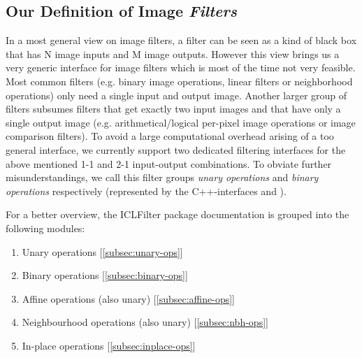 \subsection{Our Definition of Image \emph{Filters}}

In a most general view on image filters, a filter can be seen as a kind of black box that has N image inputs and M image outputs. However this view brings us a very generic interface for image filters which is most of the time not very feasible. \\
Most common filters (e.g. binary image operations, linear filters or neighborhood operations) only need a single input and output image. Another larger group of filters subsumes filters that get exactly two input images and that have only a single output image (e.g. arithmetical/logical per-pixel image operations or image comparison filters).
To avoid a large computational overhead arising of a too general interface, we currently support two dedicated filtering interfaces for the above mentioned 1-1 and 2-1 input-output combinations. To obviate further misunderstandings, we call this filter groups \emph{unary operations} and \emph{binary operations} respectively (represented by the C++-interfaces  and ).

For a better overview, the ICLFilter package documentation is grouped into the following modules:

\begin{enumerate}
\item Unary operations [\ref{subsec:unary-ops}]
\item Binary operations [\ref{subsec:binary-ops}]
\item Affine operations (also unary) [\ref{subsec:affine-ops}]
\item Neighbourhood operations (also unary) [\ref{subsec:nbh-ops}]
\item In-place operations [\ref{subsec:inplace-ops}] 
\end{enumerate}


